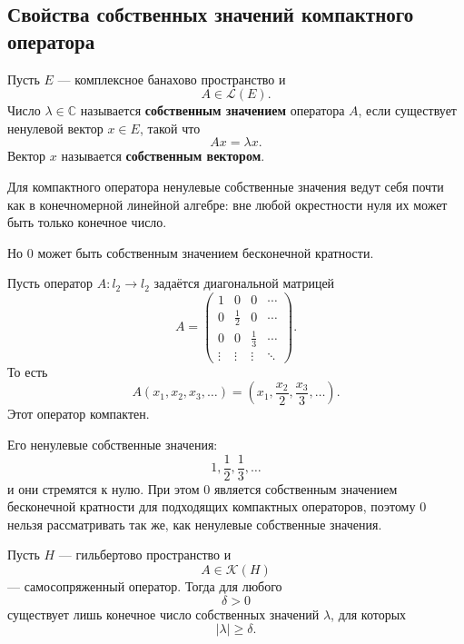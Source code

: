 \subsection{Свойства собственных значений компактного оператора}

\begin{definition}
	Пусть \(E\) --- комплексное банахово пространство и
	\[
	A\in\mathcal{L}(E).
	\]
	Число \(\lambda\in\mathbb{C}\) называется \textbf{собственным значением} оператора \(A\), если
	существует ненулевой вектор \(x\in E\), такой что
	\[
	Ax=\lambda x.
	\]
	Вектор \(x\) называется \textbf{собственным вектором}.
\end{definition}

\begin{remark}
	Для компактного оператора ненулевые собственные значения ведут себя почти как в конечномерной
	линейной алгебре: вне любой окрестности нуля их может быть только конечное число.
	
	Но \(0\) может быть собственным значением бесконечной кратности.
\end{remark}

\begin{example}
	Пусть оператор \(A:l_2\to l_2\) задаётся диагональной матрицей
	\[
	A=
	\begin{pmatrix}
		1 & 0 & 0 & \cdots\\
		0 & \frac12 & 0 & \cdots\\
		0 & 0 & \frac13 & \cdots\\
		\vdots & \vdots & \vdots & \ddots
	\end{pmatrix}.
	\]
	То есть
	\[
	A(x_1,x_2,x_3,\ldots)
	=
	\left(x_1,\frac{x_2}{2},\frac{x_3}{3},\ldots\right).
	\]
	Этот оператор компактен.
	
	Его ненулевые собственные значения:
	\[
	1,\frac12,\frac13,\ldots
	\]
	и они стремятся к нулю. При этом \(0\) является собственным значением бесконечной кратности
	для подходящих компактных операторов, поэтому \(0\) нельзя рассматривать так же, как
	ненулевые собственные значения.
\end{example}

\begin{theorem}
	Пусть \(H\) --- гильбертово пространство и
	\[
	A\in\mathcal K(H)
	\]
	--- самосопряженный оператор. Тогда для любого
	\[
	\delta>0
	\]
	существует лишь конечное число собственных значений \(\lambda\), для которых
	\[
	|\lambda|\geq\delta.
	\]
\end{theorem}

